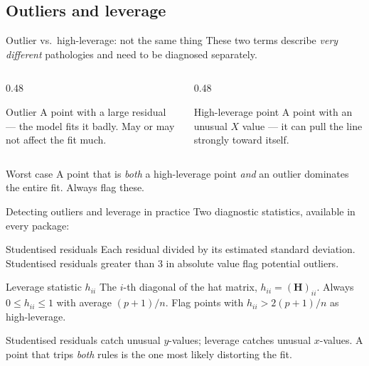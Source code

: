 \documentclass[aspectratio=169,11pt]{beamer}
\begin{document}
\subsection{Outliers and leverage}

\begin{frame}{Outlier vs.\ high-leverage: not the same thing}
  These two terms describe \emph{very different} pathologies and need
  to be diagnosed separately.
  \begin{columns}[T]
    \begin{column}{0.48\textwidth}
      \begin{block}{Outlier}
        A point with a large residual --- the model fits it badly.
        May or may not affect the fit much.
      \end{block}
    \end{column}
    \begin{column}{0.48\textwidth}
      \begin{block}{High-leverage point}
        A point with an unusual $X$ value --- it can pull the line
        strongly toward itself.
      \end{block}
    \end{column}
  \end{columns}
  \begin{alertblock}{Worst case}
    A point that is \emph{both} a high-leverage point \emph{and} an
    outlier dominates the entire fit. Always flag these.
  \end{alertblock}
\end{frame}

\begin{frame}{Detecting outliers and leverage in practice}
  Two diagnostic statistics, available in every package:
  \begin{block}{Studentised residuals}
    Each residual divided by its estimated standard deviation.
    Studentised residuals greater than $3$ in absolute value flag
    potential outliers.
  \end{block}
  \begin{block}{Leverage statistic $h_{ii}$}
    The $i$-th diagonal of the hat matrix, $h_{ii} = (\mathbf{H})_{ii}$.
    Always $0 \le h_{ii} \le 1$ with average $(p+1)/n$. Flag points with
    $h_{ii} > 2(p+1)/n$ as high-leverage.
  \end{block}
  \begin{takeaway}
    Studentised residuals catch unusual \emph{$y$}-values; leverage
    catches unusual \emph{$x$}-values. A point that trips \emph{both}
    rules is the one most likely distorting the fit.
  \end{takeaway}
\end{frame}
\end{document}
